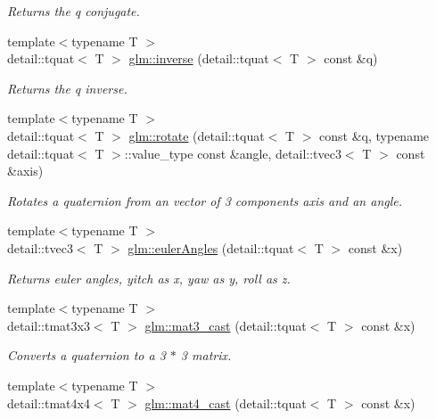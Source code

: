 \begin{DoxyCompactItemize}
\begin{DoxyCompactList}\small\item\em Returns the q conjugate. \end{DoxyCompactList}\item 
{\footnotesize template$<$typename T $>$ }\\detail\-::tquat$<$ T $>$ \hyperlink{group__gtc__quaternion_ga78b87a5e7152108e0dff0855d81b3bc1}{glm\-::inverse} (detail\-::tquat$<$ T $>$ const \&q)
\begin{DoxyCompactList}\small\item\em Returns the q inverse. \end{DoxyCompactList}\item 
{\footnotesize template$<$typename T $>$ }\\detail\-::tquat$<$ T $>$ \hyperlink{group__gtc__quaternion_ga297d6a9635153c76d7c011efa716b5da}{glm\-::rotate} (detail\-::tquat$<$ T $>$ const \&q, typename detail\-::tquat$<$ T $>$\-::value\-\_\-type const \&angle, detail\-::tvec3$<$ T $>$ const \&axis)
\begin{DoxyCompactList}\small\item\em Rotates a quaternion from an vector of 3 components axis and an angle. \end{DoxyCompactList}\item 
{\footnotesize template$<$typename T $>$ }\\detail\-::tvec3$<$ T $>$ \hyperlink{group__gtc__quaternion_gaa53e0e8933e176c6207720433fb8dd2b}{glm\-::euler\-Angles} (detail\-::tquat$<$ T $>$ const \&x)
\begin{DoxyCompactList}\small\item\em Returns euler angles, yitch as x, yaw as y, roll as z. \end{DoxyCompactList}\item 
{\footnotesize template$<$typename T $>$ }\\detail\-::tmat3x3$<$ T $>$ \hyperlink{group__gtc__quaternion_gae04ce320008c9bec0037b4ba21853cb5}{glm\-::mat3\-\_\-cast} (detail\-::tquat$<$ T $>$ const \&x)
\begin{DoxyCompactList}\small\item\em Converts a quaternion to a 3 $\ast$ 3 matrix. \end{DoxyCompactList}\item 
{\footnotesize template$<$typename T $>$ }\\detail\-::tmat4x4$<$ T $>$ \hyperlink{group__gtc__quaternion_ga8c376eb15971eb52d85df5ee26825627}{glm\-::mat4\-\_\-cast} (detail\-::tquat$<$ T $>$ const \&x)

\end{DoxyCompactItemize}
